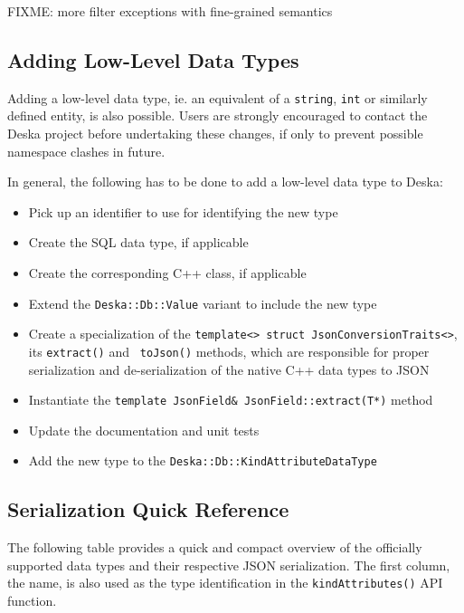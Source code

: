\documentclass{article}
\begin{document}
FIXME: more filter exceptions with fine-grained semantics

\subsection{Adding Low-Level Data Types}
\label{sec:json-extending}

Adding a low-level data type, ie. an equivalent of a {\tt string}, {\tt int} or similarly defined entity, is also
possible.  Users are strongly encouraged to contact the Deska project before undertaking these changes, if only to
prevent possible namespace clashes in future.

In general, the following has to be done to add a low-level data type to Deska:

\begin{itemize}
    \item Pick up an identifier to use for identifying the new type
    \item Create the SQL data type, if applicable
    \item Create the corresponding C++ class, if applicable
    \item Extend the {\tt Deska::Db::Value} variant to include the new type
    \item Create a specialization of the {\tt template<> struct JsonConversionTraits<>}, its {\tt extract()} and {\tt
        toJson()} methods, which are responsible for proper serialization and de-serialization of the native C++ data
        types to JSON
    \item Instantiate the {\tt template JsonField\& JsonField::extract(T*)} method
    \item Update the documentation and unit tests
    \item Add the new type to the {\tt Deska::Db::KindAttributeDataType}
\end{itemize}

\subsection{Serialization Quick Reference}
\label{sec:json-data-types-reference}

The following table provides a quick and compact overview of the officially supported data types and their respective
JSON serialization.  The first column, the name, is also used as the type identification in the {\tt kindAttributes()}
API function.
\end{document}
